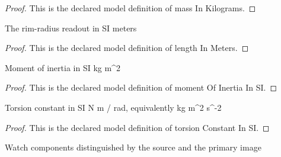 \begin{proof}
  This is the declared model definition of mass In Kilograms.
\end{proof}
\begin{definition}
  \label{def:physics:phyx-mini-0228:phyxminiproblems-problemphyxmini0228-lengthinmeters}
  The rim-radius readout in SI meters
\end{definition}
\begin{proof}
  This is the declared model definition of length In Meters.
\end{proof}
\begin{definition}
  \label{def:physics:phyx-mini-0228:phyxminiproblems-problemphyxmini0228-momentofinertiainsi}
  Moment of inertia in SI kg m\textasciicircum{}2
\end{definition}
\begin{proof}
  This is the declared model definition of moment Of Inertia In SI.
\end{proof}
\begin{definition}
  \label{def:physics:phyx-mini-0228:phyxminiproblems-problemphyxmini0228-torsionconstantinsi}
  Torsion constant in SI N m / rad, equivalently kg m\textasciicircum{}2 s\textasciicircum{}-2
\end{definition}
\begin{proof}
  This is the declared model definition of torsion Constant In SI.
\end{proof}
\begin{definition}
  \label{def:physics:phyx-mini-0228:phyxminiproblems-problemphyxmini0228-watchcomponent}
  Watch components distinguished by the source and the primary image
\end{definition}
